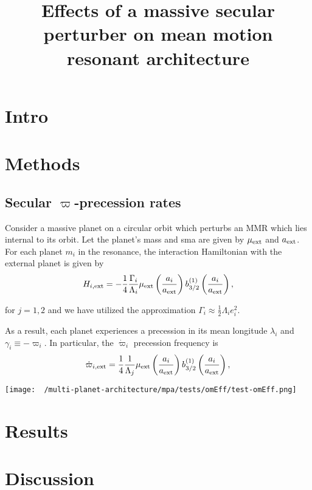\documentclass[usenatbib,onecolumn]{mnras}
\date{}
\title{Effects of a massive secular perturber on mean motion resonant architecture}
\begin{document}
\maketitle
\section{Intro}
\label{sec:org92f826b}
\section{Methods}
\label{sec:orgf297d0e}
\subsection{Secular $\varpi$-precession rates}
\label{sec:org5cd563c}
Consider a massive planet on a circular orbit which perturbs an MMR
which lies internal to its orbit.  Let the planet's mass and sma are
given by \(\mu_{\rm ext}\) and \(a_{\rm ext}\).  For each planet \(m_i\) in
the resonance, the interaction Hamiltonian with the external
planet is given by
\begin{equation}
  H_{i,\rm ext} = -\frac14 \frac{\Gamma_i}{\Lambda_i} \mu_{\rm ext}
  \left(\frac{a_i}{a_{\rm ext}}\right) b_{3/2}^{(1)}\left(\frac{a_i}{a_{\rm ext}}\right),
\end{equation}

\noindent
for \(j=1,2\) and we have utilized the approximation \(\Gamma_i \approx \frac12 \Lambda_i e_i^2\).

As a result, each planet experiences a precession in its mean longitude \(\lambda_i\) and
\(\gamma_i\equiv -\varpi_i\). In particular, the \(\dot\varpi_i\) precession frequency
is
\begin{equation}
\dot\varpi_{i, \rm ext} = \frac14 \frac{1}{\Lambda_j} \mu_{\rm ext} 
    \left(\frac{a_i}{a_{\rm ext}}\right) b_{3/2}^{(1)}\left(\frac{a_i}{a_{\rm ext}}\right),
\end{equation}

\begin{center}
\texttt{[image: ~/multi-planet-architecture/mpa/tests/omEff/test-omEff.png]}
\end{center}



\section{Results}
\label{sec:org2107ac0}
\section{Discussion}
\label{sec:orgb131450}
\end{document}
